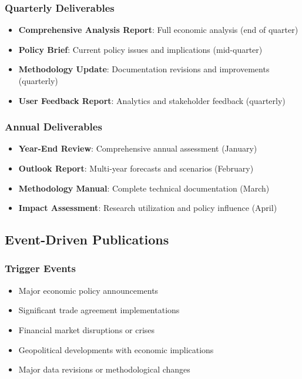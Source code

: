 \documentclass[11pt,a4paper]{article}
\begin{document}
\subsubsection{Quarterly Deliverables}
\begin{itemize}
    \item \textbf{Comprehensive Analysis Report}: Full economic analysis (end of quarter)
    \item \textbf{Policy Brief}: Current policy issues and implications (mid-quarter)
    \item \textbf{Methodology Update}: Documentation revisions and improvements (quarterly)
    \item \textbf{User Feedback Report}: Analytics and stakeholder feedback (quarterly)
\end{itemize}

\subsubsection{Annual Deliverables}
\begin{itemize}
    \item \textbf{Year-End Review}: Comprehensive annual assessment (January)
    \item \textbf{Outlook Report}: Multi-year forecasts and scenarios (February)
    \item \textbf{Methodology Manual}: Complete technical documentation (March)
    \item \textbf{Impact Assessment}: Research utilization and policy influence (April)
\end{itemize}

\subsection{Event-Driven Publications}

\subsubsection{Trigger Events}
\begin{itemize}
    \item Major economic policy announcements
    \item Significant trade agreement implementations
    \item Financial market disruptions or crises
    \item Geopolitical developments with economic implications
    \item Major data revisions or methodological changes
\end{itemize}
\end{document}
